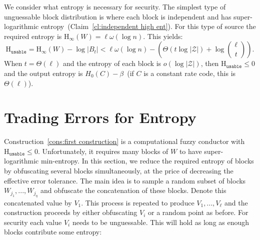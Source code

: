 \documentclass[11pt]{article}
\newcommand{\clref}[1]{\mbox{Claim~\ref{#1}}}
\newcommand{\consref}[1]{\mbox{Construction~\ref{#1}}}
\newcommand{\Hoo}{\mathrm{H}_\infty}
\newcommand{\Huse}{\mathrm{H}_{\mathtt{usable}}}
\newcommand{\authnote}[2]{{\textcolor{red}{\textsf{#1 notes: }\textcolor{blue}{ #2}}\marginpar{\textcolor{red}{\textbf{!!!!!}}}}}
\newcommand{\authnote}[2]{}
\newcommand{\lnote}[1]{{\authnote{Leo}{#1}}}
\begin{document}
We consider what entropy is necessary for security.  The simplest type of unguessable block distribution is where each block is independent and has super-logarithmic entropy~(\clref{cl:independent high ent}).  For this type of source the required entropy is $\Hoo(W) = \ell\omega(\log n)$.  This yields:
\[
\Huse = \Hoo(W) - \log |B_t| < \ell \omega(\log n) -\left( \Theta(t\log |\mathcal{Z}|) + \log {\ell \choose t}\right).
\]
When $t =\Theta(\ell)$ and the entropy of each block is $o(\log |\mathcal{Z}|)$, then $\Huse\le 0$ and the output entropy is $H_0(C) -\beta$~(if $C$ is a constant rate code, this is $\Theta(\ell)$).


\section{Trading Errors for Entropy}
\label{sec:sampling}
\consref{cons:first construction} is a computational fuzzy conductor with $\Huse\le 0$.  Unfortunately, it requires many blocks of $W$ to have super-logarithmic min-entropy.  In this section, we reduce the required entropy of blocks by obfuscating several blocks simultaneously, at the price of  decreasing the effective error tolerance.
The main idea is to sample a random subset of blocks $W_{j_1},..., W_{j_\eta}$ and obfuscate the concatenation of these blocks.  Denote this concatenated value by $V_1$.  This process is repeated to produce $V_1,..., V_\ell$ and the construction proceeds by either obfuscating $V_i$ or a random point as before. For security each value $V_i$ needs to be unguessable.  This will hold as long as enough blocks contribute some entropy:
\end{document}
